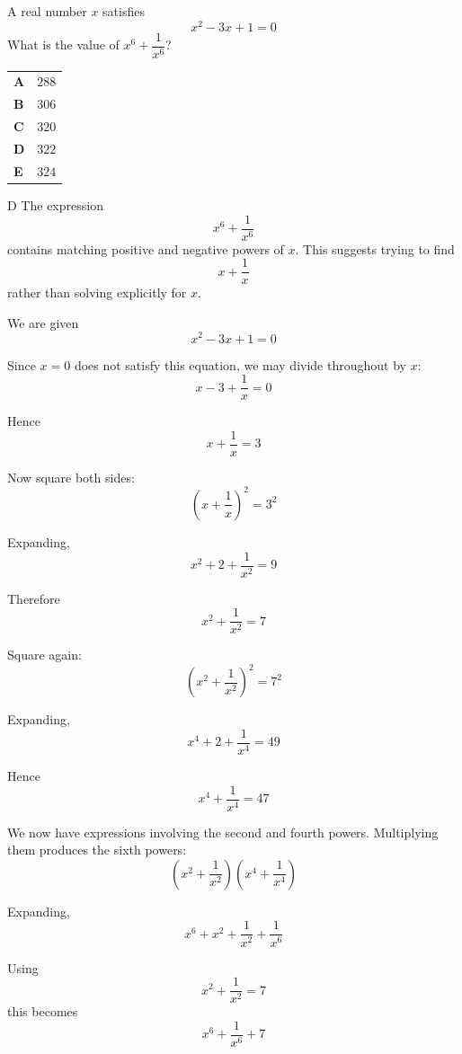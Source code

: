 \documentclass[11pt,a4paper]{article}
\begin{document}
\begin{enumerate}[label=\textbf{\arabic*.},leftmargin=*,itemsep=0pt,start=19]
\questionitem[Algebra]
A real number $x$ satisfies
\[
x^2-3x+1=0
\]
What is the value of $x^6+\dfrac{1}{x^6}$?

\par\vspace*{12pt}
\begin{tabularx}{\linewidth}{@{}>{\bfseries}l Y@{}}
A &
$288$
\\[0.8em]
B &
$306$
\\[0.8em]
C &
$320$
\\[0.8em]
D &
$322$
\\[0.8em]
E &
$324$
\\
\end{tabularx}

\begin{djsSolution}{D}
The expression
\[
x^6+\frac{1}{x^6}
\]
contains matching positive and negative powers of \(x\). This suggests trying to find
\[
x+\frac{1}{x}
\]
rather than solving explicitly for \(x\).

We are given
\[
x^2-3x+1=0
\]

Since \(x=0\) does not satisfy this equation, we may divide throughout by \(x\):
\[
x-3+\frac{1}{x}=0
\]

Hence
\[
x+\frac{1}{x}=3
\]

Now square both sides:
\[
\left(x+\frac{1}{x}\right)^2=3^2
\]

Expanding,
\[
x^2+2+\frac{1}{x^2}=9
\]

Therefore
\[
x^2+\frac{1}{x^2}=7
\]

Square again:
\[
\left(x^2+\frac{1}{x^2}\right)^2=7^2
\]

Expanding,
\[
x^4+2+\frac{1}{x^4}=49
\]

Hence
\[
x^4+\frac{1}{x^4}=47
\]

We now have expressions involving the second and fourth powers. Multiplying them produces the sixth powers:
\[
\left(x^2+\frac{1}{x^2}\right)
\left(x^4+\frac{1}{x^4}\right)
\]

Expanding,
\[
x^6+x^2+\frac{1}{x^2}+\frac{1}{x^6}
\]

Using
\[
x^2+\frac{1}{x^2}=7
\]
this becomes
\[
x^6+\frac{1}{x^6}+7
\]


\end{djsSolution}
\end{enumerate}
\end{document}
